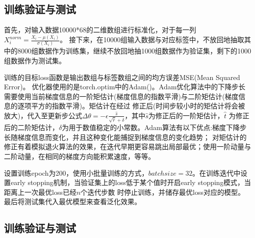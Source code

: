 \documentclass{article}
\begin{document}
\subsection*{训练验证与测试}

首先，对输入数据10000*68的二维数组进行标准化，对于每一列$X^{norm}_i=\frac{X_i-\mu(X_i)}{\sigma(X_i) } $。
接下来，在10000组输入数据与对应标签中，不放回地抽取其中的8000组数据作为训练集，继续不放回地抽1000组数据作为验证集，剩下的1000组数据作为测试集。

训练的目标loss函数是输出数组与标签数组之间的均方误差MSE(Mean Squared Error)。
优化器使用的是torch.optim中的Adam()。Adam优化算法中的下降步长需要使用当前梯度信息的一阶矩估计(梯度信息的指数平滑)与二阶矩估计(梯度信息的逐项平方的指数平滑)。矩估计在经过
修正后(时间步较小时的矩估计将会被放大)，代入至更新步公式$\Delta \theta   = -\epsilon \frac{\hat{s}}{\sqrt{\hat{r}} +\delta } $，其中$\hat{s}$为修正后的一阶矩估计，$\hat{t}$
为修正后的二阶矩估计，$\delta$为用于数值稳定的小常数。Adam算法有以下优点:梯度下降步长随梯度信息而变化，并且这种变化能捕捉到梯度信息的变化趋势；
对矩估计的修正有着模拟退火算法的效果，在迭代早期更容易跳出局部最优；使用一阶动量与二阶动量，在相同的梯度方向能积累速度，等等。

设置训练epoch为200，使用小批量训练的方式，$batchsize = 32$。在训练迭代中设置early stopping机制，当验证集上的loss低于某个值时开启early stopping模式，当距离上一次最优loss已经$n$个迭代步数
时停止训练，并储存最优loss对应的模型。最后将测试集代入最优模型来查看泛化效果。



\subsection*{训练验证与测试}
\end{document}
